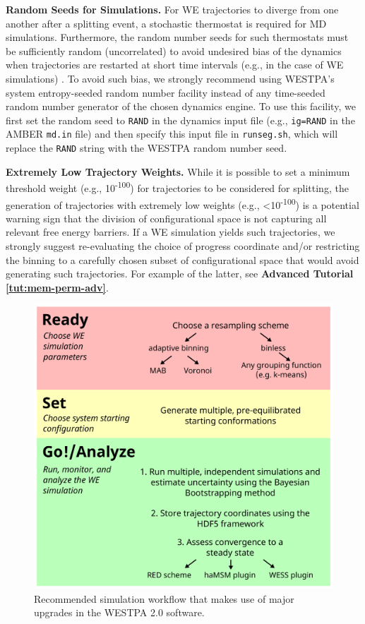 \textbf{Random Seeds for Simulations.} For WE trajectories to diverge from one another after a splitting event, a stochastic thermostat is required for MD simulations. 
Furthermore, the random number seeds for such thermostats must be sufficiently random (uncorrelated) to avoid undesired bias of the dynamics when trajectories are restarted at short time intervals (e.g., in the case of WE simulations) \citep{cerutti_vulnerability_2008}. 
To avoid such bias, we strongly recommend using WESTPA’s system entropy-seeded random number facility instead of any time-seeded random number generator of the chosen dynamics engine. 
To use this facility, we first set the random seed to \verb|RAND| in the dynamics input file (e.g., \verb|ig=RAND| in the AMBER \verb|md.in| file) and then specify this input file in \verb|runseg.sh|, which will replace the \verb|RAND| string with the WESTPA random number seed. 

\textbf{Extremely Low Trajectory Weights.} While it is possible to set a minimum threshold weight (e.g., 10\textsuperscript{-100}) for trajectories to be considered for splitting, the generation of trajectories with extremely low weights (e.g., <10\textsuperscript{-100}) is a potential warning sign that the division of configurational space is not capturing all relevant free energy barriers. 
If a WE simulation yields such trajectories, we strongly suggest re-evaluating the choice of progress coordinate and/or restricting the binning to a carefully chosen subset of configurational space that would avoid generating such trajectories.
For example of the latter, see \textbf{Advanced Tutorial \ref{tut:mem-perm-adv}}.

\begin{figure}[t]
\centering
\includegraphics[width=\columnwidth]{figures/Figure2_workflow.pdf}
\caption{Recommended simulation workflow that makes use of major upgrades in the WESTPA 2.0 software.}
\label{fig:workflow}
\end{figure}

